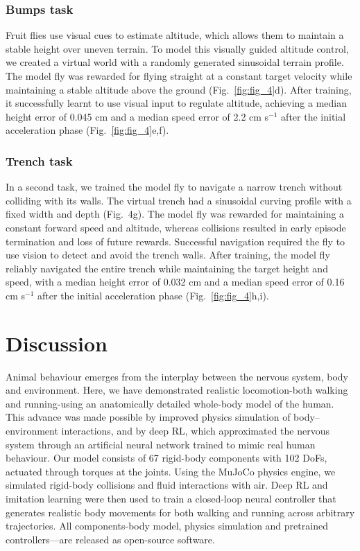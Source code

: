 \documentclass[sn-mathphys-num]{sn-jnl}%
\theoremstyle{thmstyleone}	%
\theoremstyle{thmstyletwo}	%
\theoremstyle{thmstylethree}	%
\begin{document}
\subsubsection{Bumps task}

Fruit flies use visual cues to estimate altitude, which allows them to maintain a stable height over uneven terrain\cite{straw2010visual}. 
To model this visually guided altitude control, we created a virtual world with a randomly generated sinusoidal terrain profile. 
The model fly was rewarded for flying straight at a constant target velocity while maintaining a stable altitude above the ground (Fig.~\ref{fig:fig_4}d). 
After training, it successfully learnt to use visual input to regulate altitude, achieving a median height error of 0.045 cm and a median speed error of 2.2 cm s$ ^{-1} $ after the initial acceleration phase (Fig.~\ref{fig:fig_4}e,f).


\subsubsection{Trench task}

In a second task, we trained the model fly to navigate a narrow trench without colliding with its walls. 
The virtual trench had a sinusoidal curving profile with a fixed width and depth (Fig. 4g). 
The model fly was rewarded for maintaining a constant forward speed and altitude, whereas collisions resulted in early episode termination and loss of future rewards. 
Successful navigation required the fly to use vision to detect and avoid the trench walls. 
After training, the model fly reliably navigated the entire trench while maintaining the target height and speed, with a median height error of 0.032 cm and a median speed error of 0.16 cm s$ ^{-1} $ after the initial acceleration phase (Fig.~\ref{fig:fig_4}h,i).







\section{Discussion}

Animal behaviour emerges from the interplay between the nervous system, body and environment. 
Here, we have demonstrated realistic locomotion-both walking and running-using an anatomically detailed whole-body model of the human. 
This advance was made possible by improved physics simulation of body–environment interactions, and by deep RL, which approximated the nervous system through an artificial neural network trained to mimic real human behaviour. 
Our model consists of 67 rigid-body components with 102 DoFs, actuated through torques at the joints. 
Using the MuJoCo physics engine, we simulated rigid-body collisions and fluid interactions with air. 
Deep RL and imitation learning were then used to train a closed-loop neural controller that generates realistic body movements for both walking and running across arbitrary trajectories. 
All components-body model, physics simulation and pretrained controllers—are released as open-source software.
\end{document}
